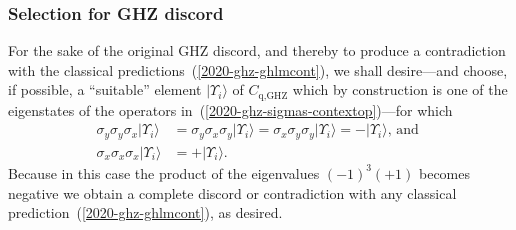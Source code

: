 \documentclass[sn-mathphys]{sn-jnl}%
\theoremstyle{thmstyleone}%
\theoremstyle{thmstyletwo}%
\theoremstyle{thmstylethree}%
\begin{document}
\subsubsection{Selection for GHZ discord}

For the sake of the original GHZ discord, and thereby to produce
a contradiction with the classical predictions~(\ref{2020-ghz-ghlmcont}),
we shall desire---and choose,
if possible, a ``suitable'' element $\vert \Upsilon_i \rangle $ of $C_\text{q,GHZ}$
which by construction is one of the eigenstates of the operators in~(\ref{2020-ghz-sigmas-contextop})---for which
\begin{equation}
\begin{aligned}
\sigma_y \sigma_y \sigma_x \vert \Upsilon_i \rangle &=
\sigma_y \sigma_x \sigma_y \vert \Upsilon_i \rangle =
\sigma_x \sigma_y \sigma_y \vert \Upsilon_i \rangle = - \vert \Upsilon_i \rangle\textrm{, and } \\
\sigma_x \sigma_x \sigma_x \vert \Upsilon_i \rangle &= + \vert \Upsilon_i \rangle .
\end{aligned}
\label{2020-ghz-sigmas-contextopwid}
\end{equation}
Because in this case the product of the eigenvalues $(- 1)^3(+ 1)$  becomes negative
we obtain a complete discord or contradiction with any classical prediction~(\ref{2020-ghz-ghlmcont}), as desired.
\end{document}
